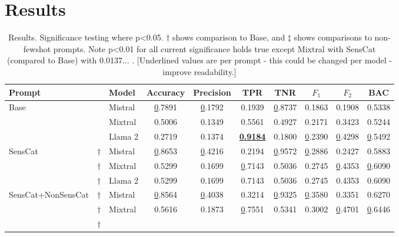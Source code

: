 \section{Results}

\begin{table*}[!h]
\caption{Results. Significance testing where p<0.05. $\dagger$ shows comparison to Base, and $\ddagger$ shows comparisons to non-fewshot prompts. Note p<0.01 for all current significance holds true except Mixtral with SensCat (compared to Base) with 0.0137... . [Underlined values are per prompt - this could be changed per model - improve readability.]}
\label{table:results}
\begin{tabular}{@{}lclccccccc@{}}
\toprule
Prompt &
  &
  Model &
  Accuracy &
  Precision &
  TPR &
  TNR &
  $F_{1}$ &
  $F_{2}$ &
  BAC \\ \midrule
\multirow{3}{*}{Base} &
  &
  Mistral &
  {\ul 0.7891} &
  {\ul 0.1792} &
  0.1939 &
  {\ul 0.8737} &
  0.1863 &
  0.1908 &
  0.5338 \\
 &
  &
  Mixtral &
  0.5006 &
  0.1349 &
  0.5561 &
  0.4927 &
  0.2171 &
  0.3423 &
  0.5244 \\
 &
  &
  Llama 2 &
  0.2719 &
  0.1374 &
  {\ul \textbf{0.9184}} &
  0.1800 &
  {\ul 0.2390} &
  {\ul 0.4298} &
  {\ul 0.5492} \\ \cmidrule(l){3-10}
\multirow{3}{*}{SensCat} &
  $\dagger$ \hspace{0.46em} &
  Mistral &
  {\ul 0.8653} &
  {\ul 0.4216} &
  0.2194 &
  {\ul 0.9572} &
  {\ul 0.2886} &
  0.2427 &
  0.5883 \\
 &
  $\dagger$ \hspace{0.46em} &
  Mixtral &
  0.5299 &
  0.1699 &
  {\ul 0.7143} &
  0.5036 &
  0.2745 &
  {\ul 0.4353} &
  {\ul 0.6090} \\
 &
  $\dagger$ \hspace{0.46em} &
  Llama 2 &
  0.5299 &
  0.1699 &
  0.7143 &
  0.5036 &
  0.2745 &
  0.4353 &
  0.6090 \\ \cmidrule(l){3-10}
\multirow{3}{*}{SensCat+NonSensCat} &
  $\dagger$ \hspace{0.46em} &
  Mistral &
  {\ul 0.8564} &
  {\ul 0.4038} &
  0.3214 &
  {\ul 0.9325} &
  {\ul 0.3580} &
  0.3351 &
  0.6270 \\
 &
  $\dagger$ \hspace{0.46em} &
  Mixtral &
  0.5616 &
  0.1873 &
  {\ul 0.7551} &
  0.5341 &
  0.3002 &
  {\ul 0.4701} &
  {\ul 0.6446} \\
 &
  $\dagger$ \hspace{0.46em} &

\end{tabular}
\end{table*}
